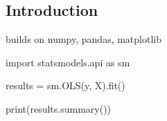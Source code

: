 
\subsection{Introduction}

builds on numpy, pandas, matplotlib

import statsmodels.api as sm

results = sm.OLS(y, X).fit()

print(results.summary())

